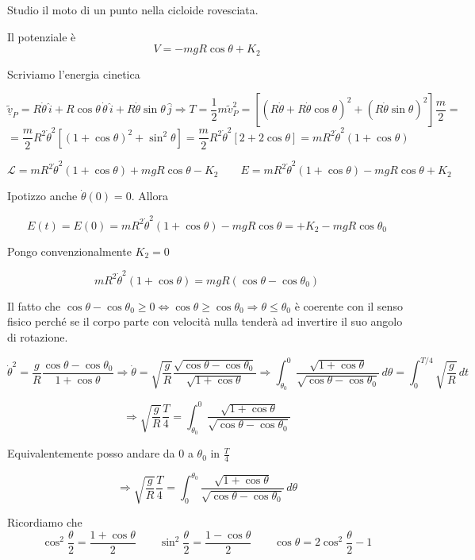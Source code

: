 Studio il moto di un punto nella cicloide rovesciata.

Il potenziale è
\[
V=-mgR\cos\theta+K_2
\]

Scriviamo l'energia cinetica

\[
\widetilde{\underline{v}}_P
=
R\dot{\theta}\,\widehat{i}
+
R\cos\theta\,\dot{\theta}\,\widehat{i}
+
R\dot{\theta}\sin\theta\,\widehat{j}
\Rightarrow
T=
\frac{1}{2}m\widetilde{v}_P^2
=
\left[
\left(R\dot{\theta}+R\dot{\theta}\cos\theta\right)^2
+
\left(R\dot{\theta}\sin\theta\right)^2
\right]\frac{m}{2}
=
\]
\[
=
\frac{m}{2}R^2\dot{\theta}^2
\left[
(1+\cos\theta)^2+\sin^2\theta
\right]
=
\frac{m}{2}R^2\dot{\theta}^2
\left[
2+2\cos\theta
\right]
=
mR^2\dot{\theta}^2(1+\cos\theta)
\]

\[
\mathcal{L}
=
mR^2\dot{\theta}^2(1+\cos\theta)
+
mgR\cos\theta
-
K_2
\qquad
E=
mR^2\dot{\theta}^2(1+\cos\theta)
-
mgR\cos\theta
+
K_2
\]

Ipotizzo anche \(\dot{\theta}(0)=0\). Allora

\[
E(t)=E(0)
=
mR^2\dot{\theta}^2(1+\cos\theta)
-
mgR\cos\theta
=
+K_2
-
mgR\cos\theta_0
\]

Pongo convenzionalmente \(K_2=0\)

\[
mR^2\dot{\theta}^2(1+\cos\theta)
=
mgR(\cos\theta-\cos\theta_0)
\]

Il fatto che \(\cos\theta-\cos\theta_0\ge 0 \Leftrightarrow \cos\theta\ge\cos\theta_0 \Rightarrow \theta\le\theta_0\) è coerente con il senso fisico perché se il corpo parte con velocità nulla tenderà ad invertire il suo angolo di rotazione.

\[
\dot{\theta}^2
=
\frac{g}{R}\frac{\cos\theta-\cos\theta_0}{1+\cos\theta}
\Rightarrow
\dot{\theta}
=
\sqrt{\frac{g}{R}}
\frac{\sqrt{\cos\theta-\cos\theta_0}}{\sqrt{1+\cos\theta}}
\Rightarrow
\int_{\theta_0}^0
\frac{\sqrt{1+\cos\theta}}{\sqrt{\cos\theta-\cos\theta_0}}\,d\theta
=
\int_0^{T/4}
\sqrt{\frac{g}{R}}\,dt
\]

\[
\Rightarrow
\sqrt{\frac{g}{R}}\frac{T}{4}
=
\int_{\theta_0}^{0}
\frac{\sqrt{1+\cos\theta}}{\sqrt{\cos\theta-\cos\theta_0}}
\]

Equivalentemente posso andare da \(0\) a \(\theta_0\) in \(\frac{T}{4}\)

\[
\Rightarrow
\sqrt{\frac{g}{R}}\frac{T}{4}
=
\int_0^{\theta_0}
\frac{\sqrt{1+\cos\theta}}{\sqrt{\cos\theta-\cos\theta_0}}\,d\theta
\]

Ricordiamo che
\[
\cos^2\frac{\theta}{2}
=
\frac{1+\cos\theta}{2}
\qquad
\sin^2\frac{\theta}{2}
=
\frac{1-\cos\theta}{2}
\qquad
\cos\theta
=
2\cos^2\frac{\theta}{2}-1
\]

